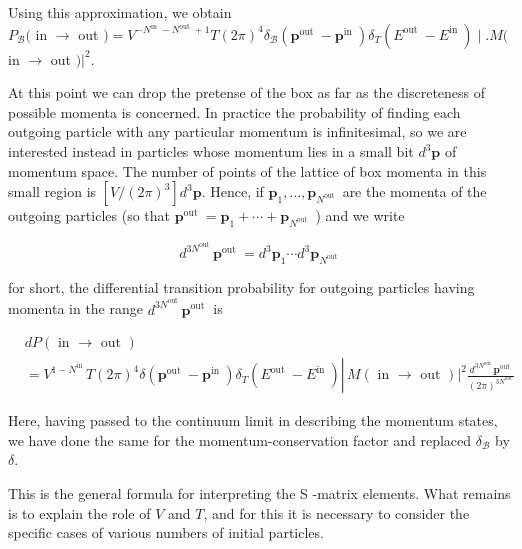 \documentclass[10pt, letterpaper]{article}
\begin{document}
Using this approximation, we obtain\\
$P_{\mathcal{B}}($ in $\rightarrow$ out $)=V^{-N^{\text {in }}-N^{\text {out }}+1} T(2 \pi)^{4} \delta_{\mathcal{B}}\left(\mathbf{p}^{\text {out }}-\mathbf{p}^{\text {in }}\right) \delta_{T}\left(E^{\text {out }}-E^{\text {in }}\right) \mid . M($ in $\rightarrow$ out $)|^{2}$.

At this point we can drop the pretense of the box as far as the discreteness of possible momenta is concerned. In practice the probability of finding each outgoing particle with any particular momentum is infinitesimal, so we are interested instead in particles whose momentum lies in a small bit $d^{3} \mathbf{p}$ of momentum space. The number of points of the lattice of box momenta in this small region is $\left[V /(2 \pi)^{3}\right] d^{3} \mathbf{p}$. Hence, if $\mathbf{p}_{1}, \ldots, \mathbf{p}_{N^{\text {out }}}$ are the momenta of the outgoing particles (so that $\mathbf{p}^{\text {out }}= \mathbf{p}_{1}+\cdots+\mathbf{p}_{N^{\text {out }}}$ ) and we write

$$
d^{3 N^{\text {out }}} \mathbf{p}^{\text {out }}=d^{3} \mathbf{p}_{1} \cdots d^{3} \mathbf{p}_{N^{\text {out }}}
$$

for short, the differential transition probability for outgoing particles having momenta in the range $d^{3 N^{\text {out }}} \mathbf{p}^{\text {out }}$ is

$$
\begin{aligned}
& d P(\text { in } \rightarrow \text { out }) \\
& =V^{1-N^{\text {in }}} T(2 \pi)^{4} \delta\left(\mathbf{p}^{\text {out }}-\mathbf{p}^{\text {in }}\right) \delta_{T}\left(E^{\text {out }}-E^{\text {in }}\right) \left\lvert\,\left. M(\text { in } \rightarrow \text { out })\right|^{2} \frac{d^{3 N^{\text {out }}} \mathbf{p}^{\text {out }}}{(2 \pi)^{3 N^{\text {out }}}}\right.
\end{aligned}
$$

Here, having passed to the continuum limit in describing the momentum states, we have done the same for the momentum-conservation factor and replaced $\delta_{\mathcal{B}}$ by $\delta$.

This is the general formula for interpreting the S -matrix elements. What remains is to explain the role of $V$ and $T$, and for this it is necessary to consider the specific cases of various numbers of initial particles.
\end{document}
